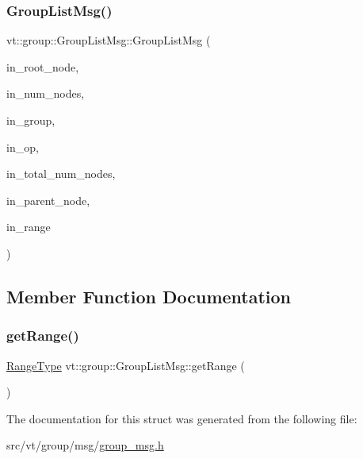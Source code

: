 \subsubsection{\texorpdfstring{Group\+List\+Msg()}{GroupListMsg()}\hspace{0.1cm}{\footnotesize\ttfamily [2/2]}}
{\footnotesize\ttfamily vt\+::group\+::\+Group\+List\+Msg\+::\+Group\+List\+Msg (\begin{DoxyParamCaption}\item[{\hyperlink{namespacevt_a866da9d0efc19c0a1ce79e9e492f47e2}{Node\+Type} const \&}]{in\+\_\+root\+\_\+node,  }\item[{\hyperlink{namespacevt_a866da9d0efc19c0a1ce79e9e492f47e2}{Node\+Type} const \&}]{in\+\_\+num\+\_\+nodes,  }\item[{\hyperlink{namespacevt_a27b5e4411c9b6140c49100e050e2f743}{Group\+Type} const \&}]{in\+\_\+group,  }\item[{\hyperlink{namespacevt_1_1group_a73f2624ddeb535b39a08b6524f26b244}{Remote\+Operation\+I\+D\+Type}}]{in\+\_\+op,  }\item[{\hyperlink{namespacevt_a866da9d0efc19c0a1ce79e9e492f47e2}{Node\+Type} const \&}]{in\+\_\+total\+\_\+num\+\_\+nodes,  }\item[{\hyperlink{namespacevt_a866da9d0efc19c0a1ce79e9e492f47e2}{Node\+Type} const \&}]{in\+\_\+parent\+\_\+node,  }\item[{\hyperlink{structvt_1_1group_1_1_group_list_msg_a4b6524168e2e6f3308b1957083fafb45}{Range\+Type} $\ast$}]{in\+\_\+range }\end{DoxyParamCaption})\hspace{0.3cm}{\ttfamily [inline]}}



\subsection{Member Function Documentation}
\mbox{\label{structvt_1_1group_1_1_group_list_msg_aab715b868388f6aaeb38e369a1b0843c}} 
\subsubsection{\texorpdfstring{get\+Range()}{getRange()}}
{\footnotesize\ttfamily \hyperlink{structvt_1_1group_1_1_group_list_msg_a4b6524168e2e6f3308b1957083fafb45}{Range\+Type} vt\+::group\+::\+Group\+List\+Msg\+::get\+Range (\begin{DoxyParamCaption}{ }\end{DoxyParamCaption})\hspace{0.3cm}{\ttfamily [inline]}}



The documentation for this struct was generated from the following file\+:\begin{DoxyCompactItemize}
\item 
src/vt/group/msg/\hyperlink{group__msg_8h}{group\+\_\+msg.\+h}\end{DoxyCompactItemize}
